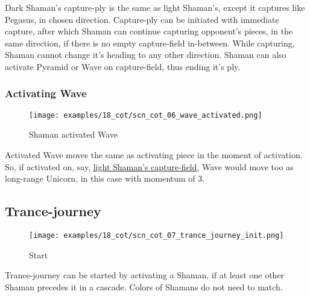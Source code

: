 Dark Shaman's capture-ply is the same as light Shaman's, except it captures like
Pegasus, in chosen direction. Capture-ply can be initiated with immediate capture,
after which Shaman can continue capturing opponent's pieces, in the same direction,
if there is no empty capture-field in-between. While capturing, Shaman cannot change
it's heading to any other direction. Shaman can also activate Pyramid or Wave on
capture-field, thus ending it's ply.

\clearpage %

\subsubsection*{Activating Wave}

\noindent
\begin{figure}[!h]
\texttt{[image: examples/18\_cot/scn\_cot\_06\_wave\_activated.png]}
\caption{Shaman activated Wave}
\label{fig:scn_cot_06_wave_activated}
\end{figure}

Activated Wave moves the same as activating piece in the moment of activation.
So, if activated on, say,
\hyperref[fig:scn_cot_03_light_shaman_capture_ply]{light Shaman's capture-field},
Wave would move too as long-range Unicorn, in this case with momentum of 3.

\clearpage %

\subsection*{Trance-journey}

\noindent
\begin{wrapfigure}[13]{l}{0.4\textwidth} %
\centering
\texttt{[image: examples/18\_cot/scn\_cot\_07\_trance\_journey\_init.png]}
\caption{Start}
\label{fig:scn_cot_07_trance_journey_init}
\end{wrapfigure}
Trance-journey can be started by activating a Shaman, if at least one other
Shaman precedes it in a cascade. Colors of Shamans do not need to match.

